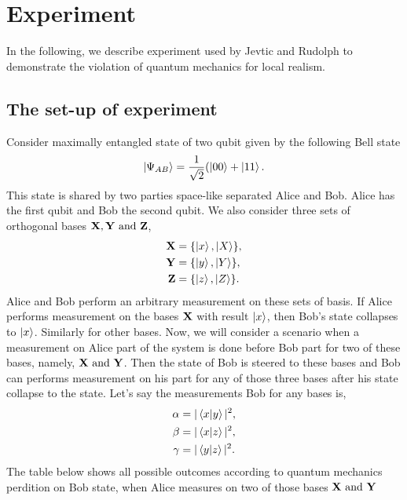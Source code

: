 \section{Experiment}\hfill \break
In the following, we describe experiment used by Jevtic and Rudolph to demonstrate the violation of quantum mechanics for local realism.
\subsection{The set-up of experiment}\hfill \break
Consider maximally entangled state of two qubit given by the following Bell state
\begin{align*}
\ket{\Psi_{AB}}=\frac{1}{\sqrt{2}}(\ket{00}+\ket{11}.
\end{align*}
This state is shared by two parties space-like separated Alice and Bob. Alice has the first qubit and Bob the second qubit.
We also consider  three sets of orthogonal bases $\bf{X}, \bf{Y} \text{ and } \bf{Z}$,
\begin{align}
 \bf{X}&=\{\ket{x},\ket{X}\},\\
 \bf{Y}&=\{\ket{y},\ket{Y}\},\\
  \bf{Z}&=\{\ket{z},\ket{Z}\}.
\end{align}
Alice and Bob perform an arbitrary measurement on these sets of basis. If Alice  performs measurement on the bases $\bf{X}$  with result $\ket{x}$, then Bob's state collapses to $\ket{x}$. Similarly for other bases. Now, we will consider a scenario when a measurement on Alice part of the system is done before Bob part for two of these bases, namely, $\bf{X} \text{ and } \bf{Y} $. Then the state of Bob is steered to these bases and Bob  can performs measurement on his part for any of those three bases after his state collapse to the state.
Let's say the measurements Bob for any bases is,
\begin{align*}
\alpha &=|\bra{x}\ket{y}|^2,\\
\beta &=|\bra{x}\ket{z}|^2,\\
\gamma& =|\bra{y}\ket{z}|^2.
\end{align*}
The table below shows all possible outcomes according to quantum mechanics perdition  on Bob state, when Alice measures on  two of those bases $\bf{X} \text{ and } \bf{Y} $



